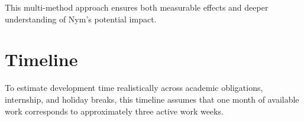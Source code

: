 \documentclass{imc-inf}
\begin{document}
This multi-method approach ensures both measurable effects and deeper understanding of Nym’s potential impact.



\chapter{Timeline}

To estimate development time realistically across academic obligations, internship, and holiday breaks, this timeline assumes that one month of available work corresponds to approximately three active work weeks.

\renewcommand{\arraystretch}{1.4} %
\end{document}
